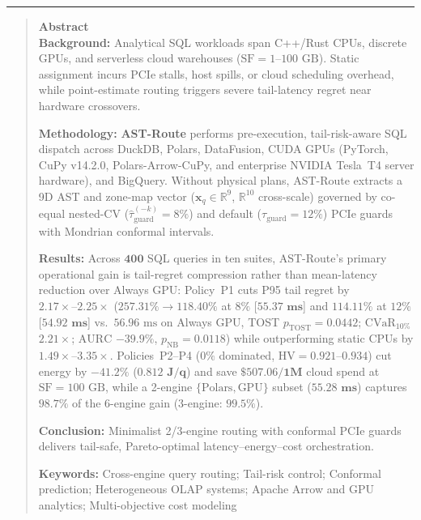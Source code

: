 \documentclass[10pt,a4paper]{article}
\begin{document}
\noindent\rule{\textwidth}{0.8pt}
\begin{quote}
\small\sffamily
\textbf{\color{springerblue}Abstract}\\[0.3em]
\textbf{Background:} Analytical SQL workloads span C++/Rust CPUs, discrete GPUs, and serverless cloud warehouses ($\text{SF}=1\text{--}100\text{ GB}$). Static assignment incurs PCIe stalls, host spills, or cloud scheduling overhead, while point-estimate routing triggers severe tail-latency regret near hardware crossovers.

\textbf{Methodology:} \textbf{AST-Route} performs pre-execution, tail-risk-aware SQL dispatch across DuckDB, Polars, DataFusion, CUDA GPUs (PyTorch, CuPy v14.2.0, Polars-Arrow-CuPy, and enterprise NVIDIA Tesla~T4 server hardware), and BigQuery. Without physical plans, AST-Route extracts a 9D AST and zone-map vector ($\mathbf{x}_q \in \mathbb{R}^{9}$, $\mathbb{R}^{10}$ cross-scale) governed by co-equal nested-CV ($\hat{\tau}_{\text{guard}}^{(-k)}=8\%$) and default ($\tau_{\text{guard}}=12\%$) PCIe guards with Mondrian conformal intervals.

\textbf{Results:} Across $\mathbf{400}$ SQL queries in ten suites, AST-Route's primary operational gain is tail-regret compression rather than mean-latency reduction over Always GPU: Policy~P1 cuts P95 tail regret by $\mathbf{2.17\times\text{--}2.25\times}$ ($257.31\% \rightarrow \mathbf{118.40\%}$ at $8\%$ [$\mathbf{55.37\text{ ms}}$] and $\mathbf{114.11\%}$ at $12\%$ [$\mathbf{54.92\text{ ms}}$] vs.\ $56.96\text{ ms}$ on Always GPU, TOST $p_{\text{TOST}}=0.0442$; $\text{CVaR}_{10\%}$ $\mathbf{2.21\times}$; $\text{AURC}$ $\mathbf{-39.9\%}$, $p_{\text{NB}}=0.0118$) while outperforming static CPUs by $\mathbf{1.49\times\text{--}3.35\times}$. Policies~P2--P4 ($0\%$ dominated, $\text{HV}=0.921\text{--}0.934$) cut energy by $\mathbf{-41.2\%}$ ($\mathbf{0.812\text{ J/q}}$) and save $\mathbf{\$507.06/1\text{M}}$ cloud spend at $\text{SF}=100\text{ GB}$, while a 2-engine $\{\text{Polars}, \text{GPU}\}$ subset ($\mathbf{55.28\text{ ms}}$) captures $\mathbf{98.7\%}$ of the 6-engine gain ($3$-engine: $\mathbf{99.5\%}$).

\textbf{Conclusion:} Minimalist 2/3-engine routing with conformal PCIe guards delivers tail-safe, Pareto-optimal latency--energy--cost orchestration.

\noindent\textbf{Keywords:} Cross-engine query routing; Tail-risk control; Conformal prediction; Heterogeneous OLAP systems; Apache Arrow and GPU analytics; Multi-objective cost modeling
\end{quote}
\end{document}
